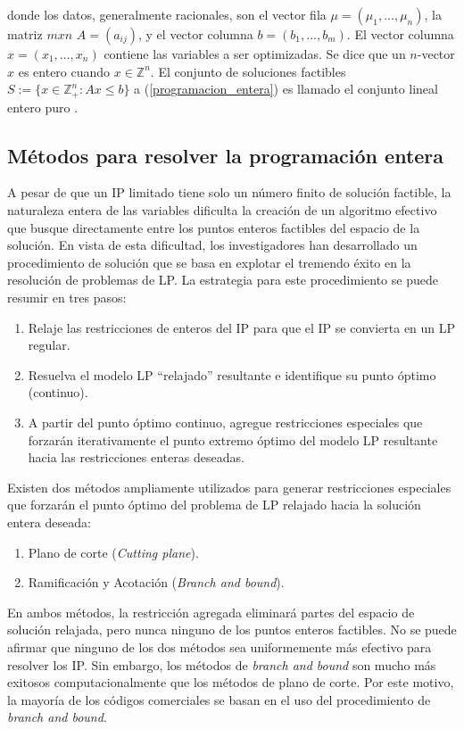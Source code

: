 donde los datos, generalmente racionales, son el vector fila $\mu = (\mu_1,...,\mu_n)$, la matriz $mxn$ $A=(a_{ij})$, y el vector columna $b=(b_1,..., b_m)$. El vector columna $x=(x_1,...,x_n)$ contiene las variables a ser optimizadas. Se dice que un $n$-vector $x$ es entero cuando $x \in \mathbb{Z}^n$. El conjunto de soluciones factibles $S := \{x \in \mathbb{Z}^n_+ : Ax \leq b\}$ a (\ref{programacion_entera}) es llamado el conjunto lineal entero puro \citep{Conforti2014IntegerProgramming}.

\subsection{Métodos para resolver la programación entera}

A pesar de que un IP limitado tiene solo un número finito de solución factible, la naturaleza entera de las variables dificulta la creación de un algoritmo efectivo que busque directamente entre los puntos enteros factibles del espacio de la solución. En vista de esta dificultad, los investigadores han desarrollado un procedimiento de solución que se basa en explotar el tremendo éxito en la resolución de problemas de LP. La estrategia para este procedimiento se puede resumir en tres pasos:

\begin{enumerate}
    \item Relaje las restricciones de enteros del IP para que el IP se convierta en un LP regular.
    \item Resuelva el modelo LP ``relajado'' resultante e identifique su punto óptimo (continuo).
    \item A partir del punto óptimo continuo, agregue restricciones especiales que forzarán iterativamente el punto extremo óptimo del modelo LP resultante hacia las restricciones enteras deseadas.
\end{enumerate}

Existen dos métodos ampliamente utilizados para generar restricciones especiales que forzarán el punto óptimo del problema de LP relajado hacia la solución entera deseada:

\begin{enumerate}
\item Plano de corte (\textit{Cutting plane}).
\item  Ramificación y Acotación (\textit{Branch and bound}).
\end{enumerate}

En ambos métodos, la restricción agregada eliminará partes del espacio de solución relajada, pero nunca ninguno de los puntos enteros factibles. No se puede afirmar que ninguno de los dos métodos sea uniformemente más efectivo para resolver los IP. Sin embargo, los métodos de \textit{branch and bound} son mucho más exitosos computacionalmente que los métodos de plano de corte. Por este motivo, la mayoría de los códigos comerciales se basan en el uso del procedimiento de \textit{branch and bound}.

